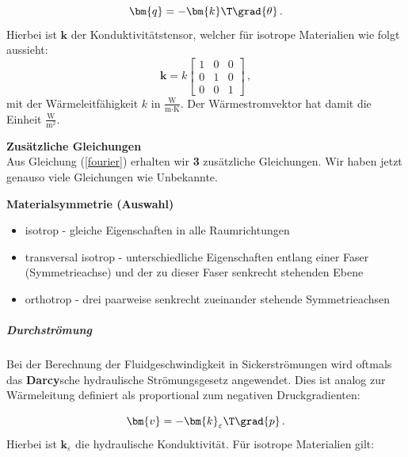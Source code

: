 \begin{equation}
\label{fourier}
\bm{q} = - \bm{k}\T  \grad{\theta} \, .
\end{equation}
Hierbei ist $\bm{k}$ der Konduktivitätstensor, welcher für isotrope Materialien wie folgt aussieht:
\begin{equation}
\label{konduktivitaetsmatrixIsotrop}
 \bm{k} = k \begin{bmatrix} 1 & 0 & 0 \\ 0 & 1 & 0 \\ 0 & 0 & 1\end{bmatrix}  \, ,
\end{equation}
mit der Wärmeleitfähigkeit $k$ in $\frac{\text{W}}{\text{m}\cdot\text{K}}$. Der Wärmestromvektor hat damit die Einheit $\frac{\text{W}}{\text{m}^2}$.

\begin{framed}
\textbf{Zusätzliche Gleichungen}\\
Aus Gleichung (\ref{fourier}) erhalten wir \textbf{3} zusätzliche Gleichungen. Wir haben jetzt genauso viele Gleichungen wie Unbekannte.
\end{framed}

\begin{framed}
\textbf{Materialsymmetrie (Auswahl)}\\
\begin{itemize}
\item isotrop - gleiche Eigenschaften in alle Raumrichtungen
\item transversal isotrop - unterschiedliche Eigenschaften entlang einer Faser (Symmetrieachse) und der zu dieser Faser senkrecht stehenden Ebene
\item orthotrop - drei paarweise senkrecht zueinander stehende Symmetrieachsen
\end{itemize}
\end{framed}


\subparagraph{Durchströmung}

Bei der Berechnung der Fluidgeschwindigkeit in Sickerströmungen wird oftmals das \textbf{Darcy}sche hydraulische Strömungsgesetz angewendet. Dies ist analog zur Wärmeleitung definiert als proportional zum negativen Druckgradienten:

\begin{equation}
\label{darcy}
\bm{v} = - \bm{k}_{\varepsilon}\T  \grad{p} \, .
\end{equation}
Hierbei ist $\bm{k}_{\varepsilon}$ die hydraulische Konduktivität. Für isotrope Materialien gilt:

